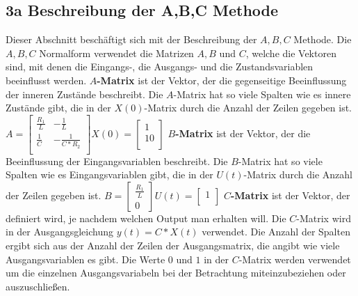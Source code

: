 \documentclass[11pt, a4paper, twoside]{article}   	%
\begin{document}
\subsection{3a Beschreibung der A,B,C Methode}
Dieser Abschnitt beschäftigt sich mit der Beschreibung der $A, B, C$ Methode.
\newline
\newline
Die $A, B, C$ Normalform verwendet die Matrizen $A, B$ und $C$, welche die Vektoren sind, mit denen die Eingangs-, die Ausgangs- und die Zustandsvariablen beeinflusst werden. 
\newline
\newline
\textbf{$A$-Matrix} ist der Vektor, der die gegenseitige Beeinflussung der inneren Zustände beschreibt. Die $A$-Matrix hat so viele Spalten wie es innere Zustände gibt, die in der $X(0)$-Matrix durch die Anzahl der Zeilen gegeben ist.
\newline
\newline
$
A = \begin{bmatrix}
	\frac{R_{1}}{L} & -\frac{1}{L} \\[0.3em]
    \frac{1}{C}     & -\frac{1}{C*R_{2}} \\[0.3em]
\end{bmatrix}
X(0) =
\begin{bmatrix}
	1  \\[0.3em]
    10 \\[0.3em]
\end{bmatrix} 
$
\newline
\newline
\newline
\textbf{$B$-Matrix} ist der Vektor, der die Beeinflussung der Eingangsvariablen beschreibt. Die $B$-Matrix hat so viele Spalten wie es Eingangsvariablen gibt, die in der $U(t)$-Matrix durch die Anzahl der Zeilen gegeben ist.
\newline
\newline
$
B = \begin{bmatrix}
	\frac{R_{1}}{L} \\[0.3em]
	0
\end{bmatrix}
U(t) =
\begin{bmatrix}
	1  \\[0.3em]
\end{bmatrix} 
$
\newline
\newline
\newline
\textbf{$C$-Matrix} ist der Vektor, der definiert wird, je nachdem welchen Output man erhalten will. Die $C$-Matrix wird in der Ausgangsgleichung $y(t) = C * X(t)$ verwendet. Die Anzahl der Spalten ergibt sich aus der Anzahl der Zeilen der Ausgangsmatrix, die angibt wie viele Ausgangsvariablen es gibt. Die Werte $0$ und $1$ in der $C$-Matrix werden verwendet um die einzelnen Ausgangsvariabeln bei der Betrachtung miteinzubeziehen oder auszuschließen.
\end{document}
